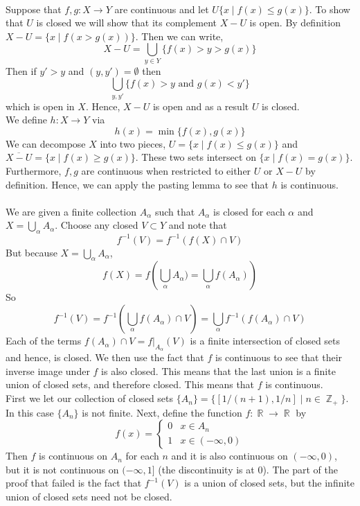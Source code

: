 \documentclass{article}
\DeclareMathOperator{\Z}{\mathbb{Z}}
\DeclareMathOperator{\R}{\mathbb{R}}
\DeclareMathOperator{\suchthat}{\mathrel{|}}
\newcommand{\problem}[1]{\noindent{\textbf{Problem #1}}\\}
\newcommand{\problempart}[1]{\noindent{\textbf{(#1)}}}
\begin{document}
\problem{18.8}
\problempart{a} Suppose that $f,g: X \to Y$ are continuous and let $U \{x \suchthat f(x) \leq g(x)\}$. To show that $U$ is closed we will show that its complement $X-U$ is open. By definition $X-U = \{x \suchthat f(x > g(x))\}$. Then we can write, 
\[
X - U = \bigcup_{y\in Y}\{f(x) > y > g(x)\}
\]
Then if $y' > y$ and $(y,y') = \emptyset$ then 
\[
\bigcup_{y,y'} \{f(x)>y \text{ and } g(x) < y'\}
\] 
which is open in $X$. Hence, $X-U$ is open and as a result $U$ is closed. \\
\problempart{b} We define $h: X \to Y$ via 
\[
h(x) = \min\{f(x), g(x)\}
\]
We can decompose $X$ into two pieces, $U = \{x \suchthat f(x) \leq g(x)\}$ and $\overline{X-U} = \{x \suchthat f(x) \geq g(x)\}$. These two sets intersect on $\{x \suchthat f(x) = g(x)\}$. Furthermore, $f,g$ are continuous when restricted to either $U$ or $X-U$ by definition. Hence, we can apply the pasting lemma to see that $h$ is continuous. \\
\problem{18.9}
\problempart{a} We are given a finite collection $A_\alpha$ such that $A_\alpha$ is closed for each $\alpha$ and $X = \bigcup_\alpha A_\alpha$. Choose any closed $V \subset Y$ and note that 
\[
f^{-1}(V) = f^{-1}(f(X) \cap V)
\]
But because $X = \bigcup_\alpha A_\alpha$, 
\[
f(X) = f\left(\bigcup_\alpha A_\alpha) = \bigcup_\alpha f(A_\alpha)\right)                      
\]
So
\[
f^{-1}(V) = f^{-1}\left(\bigcup_{\alpha}f(A_\alpha) \cap V\right) = \bigcup_\alpha f^{-1}\left(f(A_\alpha) \cap V\right)
\]
Each of the terms $f(A_\alpha) \cap V = f|_{A_\alpha}(V)$ is a finite intersection of closed sets and hence, is closed. We then use the fact that $f$ is continuous to see that their inverse image under $f$ is also closed. This means that the last union is a finite union of closed sets, and therefore closed. This means that $f$ is continuous. \\
\problempart{b} First we let our collection of closed sets $\{A_n\} = \{[1/(n+1), 1/n] \suchthat n \in \Z_+\}$. In this case $\{A_n\}$ is not finite. Next, define the function $f: \R \to \R$ by
\[
f(x) = 
\begin{cases}
0 & x\in A_n \\
1 & x\in  (-\infty, 0)
\end{cases}
\]
Then $f$ is continuous on $A_n$ for each $n$ and it is also continuous on $(-\infty, 0)$, but it is not continuous on $(-\infty, 1]$ (the discontinuity is at 0). The part of the proof that failed is the fact that $f^{-1}(V)$ is a union of closed sets, but the infinite union of closed sets need not be closed. \\
\end{document}
